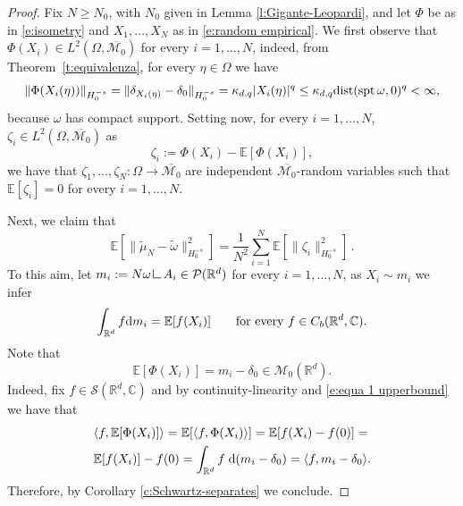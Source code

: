 \documentclass[12pt,a4paper,oneside]{amsart}
\theoremstyle{plain}
\theoremstyle{definition}
\numberwithin{equation}{section}
\numberwithin{figure}{section}
\numberwithin{table}{section}
\theoremstyle{remark}
\newcommand{\R}{\mathbb{R}}
\newcommand{\dd}{\textup{d}}
\newcommand{\calM}{\mathcal{M}}
\newcommand{\calP}{\mathcal{P}}
\newcommand\res{\mathop{\hbox{\vrule height 7pt width .5pt depth 0pt \vrule height .5pt width 6pt depth 0pt}}\nolimits}
\begin{document}
\begin{proof}
Fix $N\geq N_0$, with $N_0$ given in Lemma \ref{l:Gigante-Leopardi}, and let $\Phi$ be as in \eqref{e:isometry} and $X_1,\dots,X_N$ as in \eqref{e:random empirical}. We first observe that $\Phi(X_i)\in L^2(\Omega,\overline{\calM_0})$ for every $i=1,\dots,N$, indeed, from Theorem~\ref{t:equivalenza}, for every $\eta\in \Omega$ we have
\begin{equation*}
  \|\Phi(X_i(\eta))\|_{H^{-s}_0}= \|\delta_{X_i(\eta)}-\delta_0\|_{H^{-s}_0} =  \kappa_{d,q}|X_i(\eta)|^q \leq \kappa_{d,q} \textup{dist}(\mathrm{spt}\, \omega,0)^q <\infty, 
\end{equation*}
because $\omega$ has compact support. Setting now, for every $i=1,\dots,N$, $\zeta_i\in L^2(\Omega,\overline{\calM_0})$ as 
\begin{equation*}
    \zeta_i:=\Phi(X_i)-\mathbb E[\Phi(X_i)],
\end{equation*}
we have that $\zeta_1,\dots, \zeta_N : \Omega \to \overline{\mathcal{M}_0}$ are independent $\overline{\calM_0}$-random variables such that $\mathbb{E}[\zeta_i]=0$ for every $i=1,\dots, N$. 

Next, we claim that
\begin{equation}\label{e:mu-omega-expect-rig}
\mathbb E[\|\tilde{\mu}_N-\tilde{\omega}\|_{H_0^{-s}}^2]
=\frac1{N^2}\sum_{i=1}^N \mathbb E[\|\zeta_i\|_{H_0^{-s}}^2]\,.
\end{equation}
To this aim, let $m_i:=N \omega \res A_i \in \calP(\R^d)$ for every $i=1,\dots,N$, 
as $X_i \sim m_i$ we infer %
\begin{equation}\label{e:equa 1 upperbound}
    \int_{\R^d} f \dd m_i = \mathbb{E}[f(X_i)] \qquad \textup{for every $f\in C_b(\R^d,\mathbb{C})$}.
\end{equation}
Note that 
\begin{equation}\label{e:Valore atteso identificato}
\mathbb{E}[\Phi(X_i)] = m_i-\delta_{0}\in \mathcal{M}_0(\R^d).
\end{equation}
Indeed, fix $f\in \mathcal{S}(\R^d,\mathbb{C})$ and by continuity-linearity and \eqref{e:equa 1 upperbound} we have that 
\begin{align}\label{e:uguaglianza valore atteso}
   & \langle f,\mathbb{E}[\Phi(X_i)]\rangle = \mathbb{E}[\langle f,\Phi(X_i)\rangle]= \mathbb{E}[f(X_i)-f(0)]= \\ & \mathbb{E}[f(X_i)]-f(0)= \int_{\R^d}f \;\dd (m_i-\delta_0)= \langle f,m_i-\delta_0\rangle. \nonumber
\end{align}
Therefore, by Corollary \ref{c:Schwartz-separates} we conclude. 


\end{proof}
\end{document}
